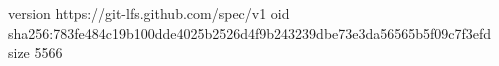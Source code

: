 version https://git-lfs.github.com/spec/v1
oid sha256:783fe484c19b100dde4025b2526d4f9b243239dbe73e3da56565b5f09c7f3efd
size 5566
